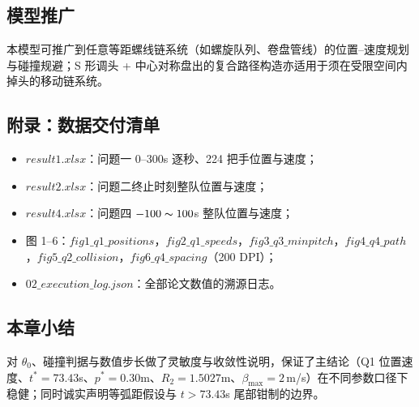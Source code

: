 \subsection{模型推广}
本模型可推广到任意等距螺线链系统（如螺旋队列、卷盘管线）的位置–速度规划与碰撞规避；S 形调头 + 中心对称盘出的复合路径构造亦适用于须在受限空间内掉头的移动链系统。

\subsection{附录：数据交付清单}
\begin{itemize}
\item $result1.xlsx$：问题一 0--300s 逐秒、224 把手位置与速度；
\item $result2.xlsx$：问题二终止时刻整队位置与速度；
\item $result4.xlsx$：问题四 $-100\thicksim100$s 整队位置与速度；
\item 图 1--6：$fig1\_q1\_positions$，$fig2\_q1\_speeds$，$fig3\_q3\_minpitch$，$fig4\_q4\_path$，$fig5\_q2\_collision$，$fig6\_q4\_spacing$（200 DPI）；
\item $02\_execution\_log.json$：全部论文数值的溯源日志。
\end{itemize}

\subsection{本章小结}
对 $\theta_0$、碰撞判据与数值步长做了灵敏度与收敛性说明，保证了主结论（Q1 位置速度、$t^{\ast}=73.43$s、$p^{\ast}=0.30$m、$R_2=1.5027$m、$\beta_{\max}=2$\,m/s）在不同参数口径下稳健；同时诚实声明等弧距假设与 $t>73.43$s 尾部钳制的边界。